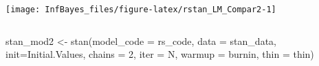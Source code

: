\documentclass[
]{book}
\newenvironment{Shaded}{\begin{snugshade}}{\end{snugshade}}
\newcommand{\AttributeTok}[1]{\textcolor[rgb]{0.77,0.63,0.00}{#1}}
\newcommand{\DecValTok}[1]{\textcolor[rgb]{0.00,0.00,0.81}{#1}}
\newcommand{\FunctionTok}[1]{\textcolor[rgb]{0.00,0.00,0.00}{#1}}
\newcommand{\NormalTok}[1]{#1}
\newcommand{\OtherTok}[1]{\textcolor[rgb]{0.56,0.35,0.01}{#1}}
\begin{document}
\begin{center}\texttt{[image: InfBayes\_files/figure-latex/rstan\_LM\_Compar2-1]} \end{center}

\(~\)

\begin{Shaded}
\begin{Highlighting}[]
\NormalTok{stan\_mod2 }\OtherTok{\textless{}{-}} \FunctionTok{stan}\NormalTok{(}\AttributeTok{model\_code =}\NormalTok{ rs\_code, }\AttributeTok{data =}\NormalTok{ stan\_data, }\AttributeTok{init=}\NormalTok{Initial.Values,}
            \AttributeTok{chains =} \DecValTok{2}\NormalTok{, }\AttributeTok{iter =}\NormalTok{ N, }\AttributeTok{warmup =}\NormalTok{ burnin, }\AttributeTok{thin =}\NormalTok{ thin)}
\end{Highlighting}
\end{Shaded}
\end{document}
